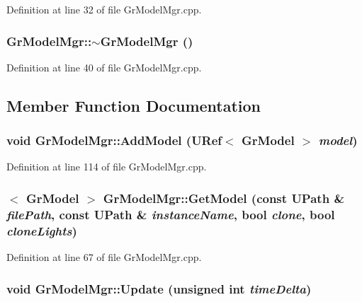 Definition at line 32 of file GrModelMgr.cpp.\hypertarget{class_gr_model_mgr_c40806807494901c46fc78ec613398ab}{
\subsubsection[{$\sim$GrModelMgr}]{\setlength{\rightskip}{0pt plus 5cm}GrModelMgr::$\sim$GrModelMgr ()}}
\label{class_gr_model_mgr_c40806807494901c46fc78ec613398ab}




Definition at line 40 of file GrModelMgr.cpp.

\subsection{Member Function Documentation}
\hypertarget{class_gr_model_mgr_17714eeebe02b7db342aa4d28efbc4d9}{
\subsubsection[{AddModel}]{\setlength{\rightskip}{0pt plus 5cm}void GrModelMgr::AddModel ({\bf URef}$<$ {\bf GrModel} $>$ {\em model})}}
\label{class_gr_model_mgr_17714eeebe02b7db342aa4d28efbc4d9}




Definition at line 114 of file GrModelMgr.cpp.\hypertarget{class_gr_model_mgr_1d0072cee000d7eb33cf894f801cb83f}{
\subsubsection[{GetModel}]{$<$ {\bf GrModel} $>$ GrModelMgr::GetModel (const {\bf UPath} \& {\em filePath}, \/  const {\bf UPath} \& {\em instanceName}, \/  bool {\em clone}, \/  bool {\em cloneLights})}}
\label{class_gr_model_mgr_1d0072cee000d7eb33cf894f801cb83f}




Definition at line 67 of file GrModelMgr.cpp.\hypertarget{class_gr_model_mgr_29ca7717cbbd93e5026c4714e6e36e9f}{
\subsubsection[{Update}]{\setlength{\rightskip}{0pt plus 5cm}void GrModelMgr::Update (unsigned int {\em timeDelta})}}
\label{class_gr_model_mgr_29ca7717cbbd93e5026c4714e6e36e9f}




